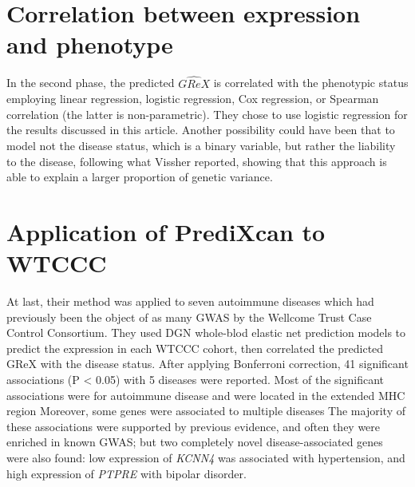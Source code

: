 \documentclass[../main.tex]{subfiles}
\begin{document}
\section{Correlation between expression and phenotype}

In the second phase, the predicted $\widehat{GReX}$ is correlated with 
the phenotypic status employing linear regression, logistic regression, 
Cox regression, or Spearman correlation (the latter is non-parametric). 
They chose to use logistic regression for the results discussed in this 
article. Another possibility could have been that to model not the 
disease status, which is a binary variable, but rather the liability to 
the disease, following what Vissher\cite{Visscher2008} reported, showing 
that this approach is able to explain a larger proportion of genetic 
variance.

\section{Application of PrediXcan to WTCCC}

At last, their method was applied to seven autoimmune diseases which had 
previously been the object of as many GWAS by the Wellcome Trust Case 
Control Consortium. They used DGN whole-blod elastic net prediction 
models to predict the expression in each WTCCC cohort, then correlated 
the predicted GReX with the disease status. After applying Bonferroni 
correction, 41 significant associations (P < 0.05) with 5 diseases were 
reported. Most of the significant associations were for autoimmune 
disease and were located in the extended MHC 
region 
Moreover, some genes were associated to multiple diseases The majority of these 
associations were supported by previous evidence, and often they were 
enriched in known GWAS; but two completely novel disease-associated 
genes were also found: low expression of \textit{KCNN4} was associated 
with hypertension, and high expression of \textit{PTPRE} with bipolar 
disorder.
\end{document}
